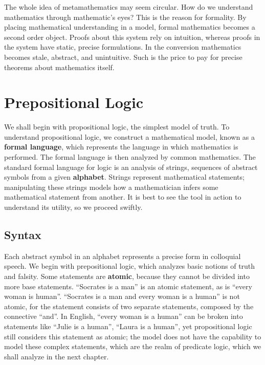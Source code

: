 The whole idea of metamathematics may seem circular. How do we understand mathematics through mathematic's eyes? This is the reason for formality. By placing mathematical understanding in a model, formal mathematics becomes a second order object. Proofs about this system rely on intuition, whereas proofs in the system have static, precise formulations. In the conversion mathematics becomes stale, abstract, and unintuitive. Such is the price to pay for precise theorems about mathematics itself.



\chapter{Prepositional Logic}

We shall begin with propositional logic, the simplest model of truth. To understand propositional logic, we construct a mathematical model, known as a {\bf formal language}, which represents the language in which mathematics is performed. The formal language is then analyzed by common mathematics. The standard formal language for logic is an analysis of strings, sequences of abstract symbols from a given {\bf alphabet}. Strings represent mathematical statements; manipulating these strings models how a mathematician infers some mathematical statement from another. It is best to see the tool in action to understand its utility, so we proceed swiftly.

\section{Syntax}

Each abstract symbol in an alphabet represents a precise form in colloquial speech. We begin with prepositional logic, which analyzes basic notions of truth and falsity. Some statements are {\bf atomic}, because they cannot be divided into more base statements. ``Socrates is a man'' is an atomic statement, as is ``every woman is human''. ``Socrates is a man and every woman is a human'' is not atomic, for the statement consists of two separate statements, composed by the connective ``and''. In English, ``every woman is a human'' can be broken into statements like ``Julie is a human'', ``Laura is a human'', yet propositional logic still considers this statement as atomic; the model does not have the capability to model these complex statements, which are the realm of predicate logic, which we shall analyze in the next chapter.

